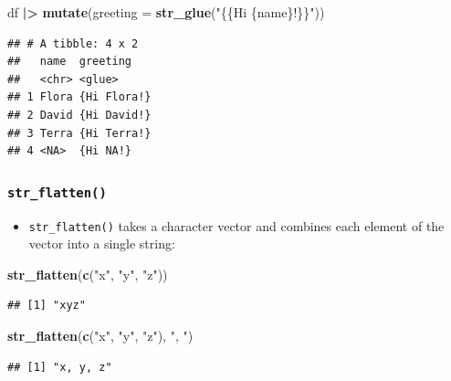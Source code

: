 \documentclass[
]{article}
\newenvironment{Shaded}{\begin{snugshade}}{\end{snugshade}}
\newcommand{\AttributeTok}[1]{\textcolor[rgb]{0.13,0.29,0.53}{#1}}
\newcommand{\FunctionTok}[1]{\textcolor[rgb]{0.13,0.29,0.53}{\textbf{#1}}}
\newcommand{\NormalTok}[1]{#1}
\newcommand{\SpecialCharTok}[1]{\textcolor[rgb]{0.81,0.36,0.00}{\textbf{#1}}}
\newcommand{\StringTok}[1]{\textcolor[rgb]{0.31,0.60,0.02}{#1}}
\providecommand{\tightlist}{%
  \setlength{\itemsep}{0pt}\setlength{\parskip}{0pt}}
\begin{document}
\begin{Shaded}
\begin{Highlighting}[]
\NormalTok{df }\SpecialCharTok{|\textgreater{}} 
  \FunctionTok{mutate}\NormalTok{(}\AttributeTok{greeting =} \FunctionTok{str\_glue}\NormalTok{(}\StringTok{"\{\{Hi \{name\}!\}\}"}\NormalTok{))}
\end{Highlighting}
\end{Shaded}

\begin{verbatim}
## # A tibble: 4 x 2
##   name  greeting   
##   <chr> <glue>     
## 1 Flora {Hi Flora!}
## 2 David {Hi David!}
## 3 Terra {Hi Terra!}
## 4 <NA>  {Hi NA!}
\end{verbatim}

\subsubsection{\texorpdfstring{\texttt{str\_flatten()}}{str\_flatten()}}\label{str_flatten}

\begin{itemize}
\tightlist
\item
  \texttt{str\_flatten()} takes a character vector and combines each
  element of the vector into a single string:
\end{itemize}

\begin{Shaded}
\begin{Highlighting}[]
\FunctionTok{str\_flatten}\NormalTok{(}\FunctionTok{c}\NormalTok{(}\StringTok{"x"}\NormalTok{, }\StringTok{"y"}\NormalTok{, }\StringTok{"z"}\NormalTok{))}
\end{Highlighting}
\end{Shaded}

\begin{verbatim}
## [1] "xyz"
\end{verbatim}

\begin{Shaded}
\begin{Highlighting}[]
\FunctionTok{str\_flatten}\NormalTok{(}\FunctionTok{c}\NormalTok{(}\StringTok{"x"}\NormalTok{, }\StringTok{"y"}\NormalTok{, }\StringTok{"z"}\NormalTok{), }\StringTok{", "}\NormalTok{)}
\end{Highlighting}
\end{Shaded}

\begin{verbatim}
## [1] "x, y, z"
\end{verbatim}
\end{document}
